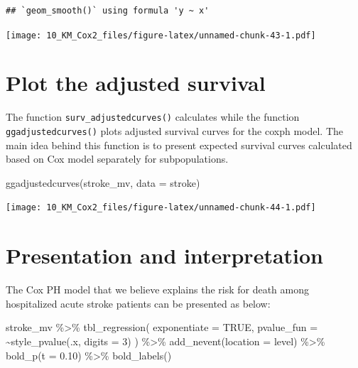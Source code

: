 \documentclass[
  10pt,
]{krantz}
\newenvironment{Shaded}{\begin{snugshade}}{\end{snugshade}}
\newcommand{\AttributeTok}[1]{\textcolor[rgb]{0.77,0.63,0.00}{#1}}
\newcommand{\ConstantTok}[1]{\textcolor[rgb]{0.00,0.00,0.00}{#1}}
\newcommand{\DecValTok}[1]{\textcolor[rgb]{0.00,0.00,0.81}{#1}}
\newcommand{\FloatTok}[1]{\textcolor[rgb]{0.00,0.00,0.81}{#1}}
\newcommand{\FunctionTok}[1]{\textcolor[rgb]{0.00,0.00,0.00}{#1}}
\newcommand{\NormalTok}[1]{#1}
\newcommand{\SpecialCharTok}[1]{\textcolor[rgb]{0.00,0.00,0.00}{#1}}
\newcommand{\StringTok}[1]{\textcolor[rgb]{0.31,0.60,0.02}{#1}}
\begin{document}
\begin{verbatim}
## `geom_smooth()` using formula 'y ~ x'
\end{verbatim}

\texttt{[image: 10\_KM\_Cox2\_files/figure-latex/unnamed-chunk-43-1.pdf]}

\hypertarget{plot-the-adjusted-survival}{%
\section{\texorpdfstring{Plot the adjusted survival}{Plot the adjusted survival}}\label{plot-the-adjusted-survival}}

The function \texttt{surv\_adjustedcurves()} calculates while the function \texttt{ggadjustedcurves()} plots adjusted survival curves for the coxph model. The main idea behind this function is to present expected survival curves calculated based on Cox model separately for subpopulations.

\begin{Shaded}
\begin{Highlighting}[]
\FunctionTok{ggadjustedcurves}\NormalTok{(stroke\_mv, }
                 \AttributeTok{data =}\NormalTok{ stroke)}
\end{Highlighting}
\end{Shaded}

\texttt{[image: 10\_KM\_Cox2\_files/figure-latex/unnamed-chunk-44-1.pdf]}

\hypertarget{presentation-and-interpretation-4}{%
\section{Presentation and interpretation}\label{presentation-and-interpretation-4}}

The Cox PH model that we believe explains the risk for death among hospitalized acute stroke patients can be presented as below:

\begin{Shaded}
\begin{Highlighting}[]
\NormalTok{stroke\_mv }\SpecialCharTok{\%\textgreater{}\%}
  \FunctionTok{tbl\_regression}\NormalTok{(}
    \AttributeTok{exponentiate =} \ConstantTok{TRUE}\NormalTok{,}
    \AttributeTok{pvalue\_fun =} \SpecialCharTok{\textasciitilde{}}\FunctionTok{style\_pvalue}\NormalTok{(.x, }\AttributeTok{digits =} \DecValTok{3}\NormalTok{)}
\NormalTok{    ) }\SpecialCharTok{\%\textgreater{}\%}
  \FunctionTok{add\_nevent}\NormalTok{(}\AttributeTok{location =} \StringTok{\textquotesingle{}level\textquotesingle{}}\NormalTok{) }\SpecialCharTok{\%\textgreater{}\%}
  \FunctionTok{bold\_p}\NormalTok{(}\AttributeTok{t =} \FloatTok{0.10}\NormalTok{) }\SpecialCharTok{\%\textgreater{}\%}
  \FunctionTok{bold\_labels}\NormalTok{()}
\end{Highlighting}
\end{Shaded}
\end{document}
